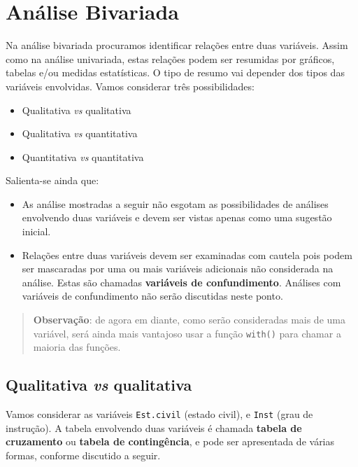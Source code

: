 \documentclass[
  10pt,
  a4paper]{book}
\providecommand{\tightlist}{%
  \setlength{\itemsep}{0pt}\setlength{\parskip}{0pt}}
\begin{document}
\hypertarget{anuxe1lise-bivariada}{%
\section{Análise Bivariada}\label{anuxe1lise-bivariada}}

Na análise bivariada procuramos identificar relações entre duas variáveis.
Assim como na análise univariada, estas relações podem ser resumidas por
gráficos, tabelas e/ou medidas estatísticas.
O tipo de resumo vai depender dos tipos das variáveis envolvidas.
Vamos considerar três possibilidades:

\begin{itemize}
\tightlist
\item
  Qualitativa \emph{vs} qualitativa
\item
  Qualitativa \emph{vs} quantitativa
\item
  Quantitativa \emph{vs} quantitativa
\end{itemize}

Salienta-se ainda que:

\begin{itemize}
\tightlist
\item
  As análise mostradas a seguir não esgotam as possibilidades de
  análises envolvendo duas variáveis e devem ser vistas apenas como uma
  sugestão inicial.
\item
  Relações entre duas variáveis devem ser examinadas com cautela pois
  podem ser mascaradas por uma ou mais variáveis adicionais não
  considerada na análise. Estas são chamadas \textbf{variáveis de
  confundimento}. Análises com variáveis de confundimento não serão
  discutidas neste ponto.
\end{itemize}

\begin{quote}
\textbf{Observação}: de agora em diante, como serão consideradas mais de
uma variável, será ainda mais vantajoso usar a função \texttt{with()} para
chamar a maioria das funções.
\end{quote}

\hypertarget{qualitativa-vs-qualitativa}{%
\subsection{\texorpdfstring{Qualitativa \emph{vs} qualitativa}{Qualitativa vs qualitativa}}\label{qualitativa-vs-qualitativa}}

Vamos considerar as variáveis \texttt{Est.civil} (estado civil), e \texttt{Inst} (grau
de instrução). A tabela envolvendo duas variáveis é chamada \textbf{tabela de
cruzamento} ou \textbf{tabela de contingência}, e pode ser apresentada de
várias formas, conforme discutido a seguir.
\end{document}
